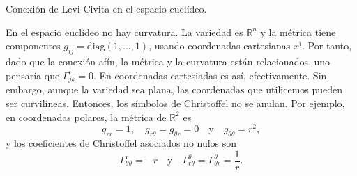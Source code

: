\begin{observation}
    {Conexión de Levi-Civita en el espacio euclídeo.
    \label{obs.4-conexion_lc_euclidea}}

    En el espacio euclídeo no hay curvatura. La variedad es \(\mathbb{R}^n\) y la métrica tiene componentes \(g_{ij}=\text{diag}(1, ..., 1)\), usando coordenadas cartesianas \(x^i\). Por tanto, dado que la conexión afín, la métrica y la curvatura están relacionados, uno pensaría que \(\Gamma^{i}_{jk} = 0\). En coordenadas cartesiadas es así, efectivamente. Sin embargo, aunque la variedad sea plana, las coordenadas que utilicemos pueden ser curvilíneas. Entonces, los símbolos de Christoffel no se anulan. Por ejemplo, en coordenadas polares, la métrica de \(\mathbb{R}^2\) es
    \begin{equation}
        g_{rr} = 1,\quad g_{r\theta} = g_{\theta r} = 0\quad\text{y}\quad g_{\theta\theta} = r^2,
    \end{equation}
    y los coeficientes de Christoffel asociados no nulos son
    \begin{equation}
        \Gamma^{r}_{\theta\theta} = -r\quad\text{y}\quad \Gamma^{\theta}_{r\theta} = \Gamma^\theta_{\theta r} = \frac{1}{r}.
    \end{equation}


\end{observation}
